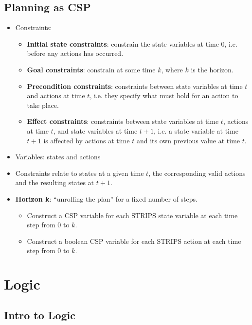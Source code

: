 \documentclass{article}
\begin{document}
\subsection{Planning as CSP}

\begin{itemize}
    \item Constraints:
        \begin{itemize}
            \item \textbf{Initial state constraints}: constrain the state variables at time 0, i.e. before any actions has occurred.
            \item \textbf{Goal constraints}: constrain at some time $k$, where $k$ is the horizon.
            \item \textbf{Precondition constraints}: constraints between state variables at time $t$ and actions at time $t$, i.e. they specify what must hold for an action to take place.
            \item \textbf{Effect constraints}: constraints between state variables at time $t$, actions at time $t$, and state variables at time $t + 1$, i.e. a state variable at time $t + 1$ is affected by actions at time $t$ and its own previous value at time $t$.
        \end{itemize}
    \item Variables: states and actions
    \item Constraints relate to states at a given time $t$, the corresponding valid actions and the resulting states at $t + 1$.
    \item \textbf{Horizon k}: ``unrolling the plan'' for a fixed number of steps.
        \begin{itemize}
            \item Construct a CSP variable for each STRIPS state variable at each time step from $0$ to $k$.
            \item Construct a boolean CSP variable for each STRIPS action at each time step from $0$ to $k$.
        \end{itemize}
\end{itemize}

\section{Logic}

\subsection{Intro to Logic}
\end{document}
